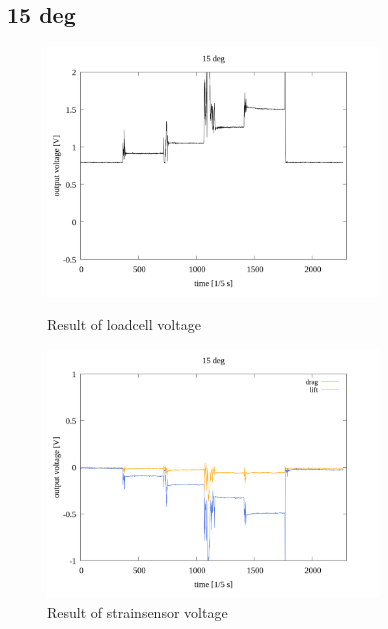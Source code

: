 \documentclass[twocolumn,a4j]{jsarticle}
\begin{document}
\subsection{15 deg}
\begin{figure}[htbp]
    \footnotesize
    \begin{center}
        \includegraphics[width=88mm]{../images/voltage-time/15_loadcell.png}
        \caption{Result of loadcell voltage}
        \includegraphics[width=88mm]{../images/voltage-time/15_strainsensor.png}
        \caption{Result of strainsensor voltage}
    \end{center}
\end{figure}

\newpage
\end{document}
